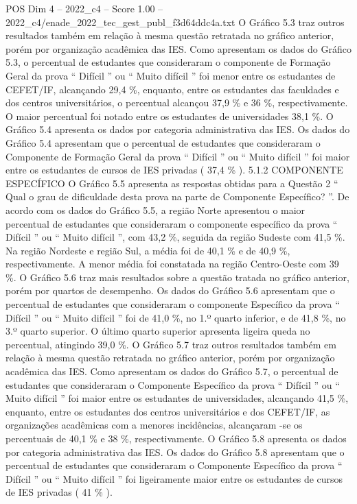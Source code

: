 \begin{textsample}{POS Dim 4 – 2022\_c4 – Score 1.00 – 2022\_c4/enade\_2022\_tec\_gest\_publ\_f3d64ddc4a.txt}
O Gráfico 5.3 traz outros resultados também em relação à mesma questão retratada no gráfico anterior, porém por organização acadêmica das IES.
Como apresentam os dados do Gráfico 5.3, o percentual de estudantes que consideraram o componente de Formação Geral da prova “ Difícil ” ou “ Muito difícil ” foi menor entre os estudantes de CEFET/IF, alcançando 29,4 \%, enquanto, entre os estudantes das faculdades e dos centros universitários, o percentual alcançou 37,9 \% e 36 \%, respectivamente.
O maior percentual foi notado entre os estudantes de universidades 38,1 \%.
O Gráfico 5.4 apresenta os dados por categoria administrativa das IES.
Os dados do Gráfico 5.4 apresentam que o percentual de estudantes que consideraram o Componente de Formação Geral da prova “ Difícil ” ou “ Muito difícil ” foi maior entre os estudantes de cursos de IES privadas ( 37,4 \% ). 5.1.2 COMPONENTE ESPECÍFICO O Gráfico 5.5 apresenta as respostas obtidas para a Questão 2 “ Qual o grau de dificuldade desta prova na parte de Componente Específico? ”.
De acordo com os dados do Gráfico 5.5, a região Norte apresentou o maior percentual de estudantes que consideraram o componente específico da prova “ Difícil ” ou “ Muito difícil ”, com 43,2 \%, seguida da região Sudeste com 41,5 \%.
Na região Nordeste e região Sul, a média foi de 40,1 \% e de 40,9 \%, respectivamente.
A menor média foi constatada na região Centro-Oeste com 39 \%.
O Gráfico 5.6 traz mais resultados sobre a questão tratada no gráfico anterior, porém por quartos de desempenho.
Os dados do Gráfico 5.6 apresentam que o percentual de estudantes que consideraram o componente Específico da prova “ Difícil ” ou “ Muito difícil ” foi de 41,0 \%, no 1.º quarto inferior, e de 41,8 \%, no 3.º quarto superior.
O último quarto superior apresenta ligeira queda no percentual, atingindo 39,0 \%.
O Gráfico 5.7 traz outros resultados também em relação à mesma questão retratada no gráfico anterior, porém por organização acadêmica das IES.
Como apresentam os dados do Gráfico 5.7, o percentual de estudantes que consideraram o Componente Específico da prova “ Difícil ” ou “ Muito difícil ” foi maior entre os estudantes de universidades, alcançando 41,5 \%, enquanto, entre os estudantes dos centros universitários e dos CEFET/IF, as organizações acadêmicas com a menores incidências, alcançaram -se os percentuais de 40,1 \% e 38 \%, respectivamente.
O Gráfico 5.8 apresenta os dados por categoria administrativa das IES.
Os dados do Gráfico 5.8 apresentam que o percentual de estudantes que consideraram o Componente Específico da prova “ Difícil ” ou “ Muito difícil ” foi ligeiramente maior entre os estudantes de cursos de IES privadas ( 41 \% ).

\end{textsample}
